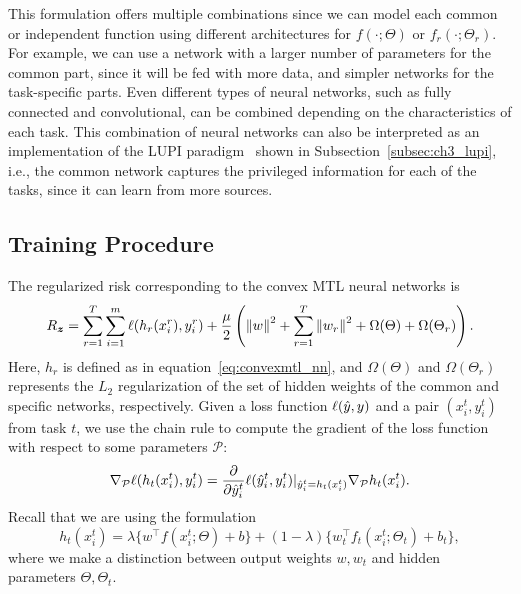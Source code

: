 This formulation offers multiple combinations since we can model each common or independent function using different architectures for $f(\cdot; \Theta)$ or $f_r(\cdot; \Theta_r)$.
%
For example, we can use a network with a larger number of parameters for the common part, since it will be fed with more data, and simpler networks for the task-specific parts.
%
Even different types of neural networks, such as fully connected and convolutional, can be combined depending on the characteristics of each task.
This combination of neural networks can also be interpreted as an implementation of the LUPI paradigm~\citep{VapnikI15a} shown in Subsection~\ref{subsec:ch3_lupi}, i.e., the common network captures the privileged information for each of the tasks, since it can learn from more sources.
%

%
\subsection{Training Procedure}
The regularized risk corresponding to the convex MTL neural networks is
\begin{equation}
    \label{eq:regrisk_convex_nn}
    \begin{aligned}
        \risk_{\bsample} = \sum_{r=1}^\ntasks \sum_{i=1}^{m} \lossf(h_r(x_i^r), y_i^r) + \frac{\mu}{2} \left( \norm{w}^2 + \sum_{r=1}^\ntasks \norm{w_r}^2 + \Omega(\Theta) + \Omega(\Theta_r)\right) .
    \end{aligned}
\end{equation}
Here, $h_r$ is defined as in equation~\eqref{eq:convexmtl_nn}, and $\Omega(\Theta)$ and $\Omega(\Theta_r)$ represents the $L_2$ regularization of the set of hidden weights of the common and specific networks, respectively.
Given a loss function $\ell(\hat{y}, y)$ and a pair $(x_i^t, y_i^t)$ from task $t$, we use the chain rule to compute the gradient of the loss function with respect to some parameters $\mathcal{P}$:
\begin{equation}\label{eq:gradient_p}
    \nabla_\mathcal{P} \lossf(h_t(x_i^t), y_i^t) = 
    \frac{\partial}{\partial \hat{y}_i^t} \lossf(\hat{y}_i^t, y_i^t) \vert_{\hat{y}_i^t = h_t(x_i^t)} \nabla_\mathcal{P} h_t(x_i^t) .
\end{equation}
Recall that we are using the formulation 
$$h_t(x_i^t)
= \lambda \lbrace w^\intercal f(x_i^t; \Theta) + b \rbrace + (1 - \lambda) \lbrace w_t^\intercal f_t(x_i^t; \Theta_t) + b_t \rbrace, $$
where we make a distinction between output weights $w, w_t$ and hidden parameters $\Theta, \Theta_t$.
